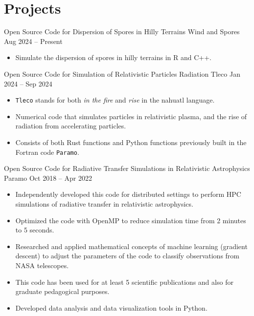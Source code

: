 \section{Projects}
%
{Open Source Code for Dispersion of Spores in Hilly Terrains}%
{Wind and Spores}%
{Aug 2024 -- Present}%
{}%
{%
\begin{itemize}
    \item Simulate the dispersion of spores in hilly terrains in R and C++.
\end{itemize}
}
%
{Open Source Code for Simulation of Relativistic Particles Radiation}%
{Tleco}%
{Jan 2024 -- Sep 2024}%
{}%
{%
\begin{itemize}
    \item \texttt{Tleco} stands for both \emph{in the fire} and \emph{rise} in the nahuatl language. 
    \item Numerical code that simulates particles in relativistic plasma, and the rise of radiation from accelerating particles.
    \item Consists of both Rust functions and Python functions previously built in the Fortran code \texttt{Paramo}.
\end{itemize}
}
%
{Open Source Code for Radiative Transfer Simulations in Relativistic Astrophysics}%
{Paramo}%
{Oct 2018 -- Apr 2022}%
{}%
{%
\begin{itemize}
    \item Independently developed this code for distributed settings to perform HPC simulations of radiative transfer in relativistic astrophysics.
    \item Optimized the code with OpenMP to reduce simulation time from 2 minutes to 5 seconds.
    \item Researched and applied mathematical concepts of machine learning (gradient descent) to adjust the parameters of the code to classify observations from NASA telescopes.
    \item This code has been used for at least 5 scientific publications and also for graduate pedagogical purposes.
    \item Developed data analysis and data visualization tools in Python.
\end{itemize}
}
